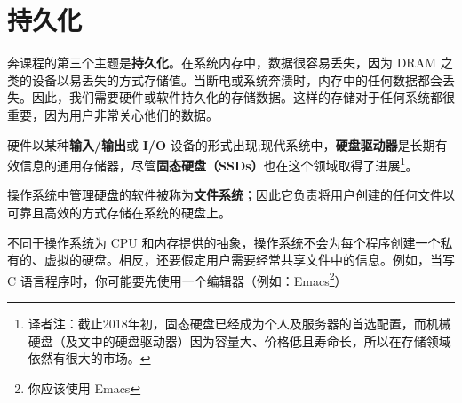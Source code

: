 \section{持久化}
奔课程的第三个主题是\textbf{持久化}。在系统内存中，数据很容易丢失，因为 DRAM 之类的设备以易丢失的方式存储值。当断电或系统奔溃时，内存中的任何数据都会丢失。因此，我们需要硬件或软件持久化的存储数据。这样的存储对于任何系统都很重要，因为用户非常关心他们的数据。

硬件以某种\textbf{输入/输出}或 \textbf{I/O} 设备的形式出现;现代系统中，\textbf{硬盘驱动器}是长期有效信息的通用存储器，尽管\textbf{固态硬盘（SSDs）}也在这个领域取得了进展\footnote{译者注：截止2018年初，固态硬盘已经成为个人及服务器的首选配置，而机械硬盘（及文中的硬盘驱动器）因为容量大、价格低且寿命长，所以在存储领域依然有很大的市场。}。

操作系统中管理硬盘的软件被称为\textbf{文件系统}；因此它负责将用户创建的任何文件以可靠且高效的方式存储在系统的硬盘上。

不同于操作系统为 CPU 和内存提供的抽象，操作系统不会为每个程序创建一个私有的、虚拟的硬盘。相反，还要假定用户需要经常共享文件中的信息。例如，当写 C 语言程序时，你可能要先使用一个编辑器（例如：Emacs\footnote{你应该使用 Emacs}）